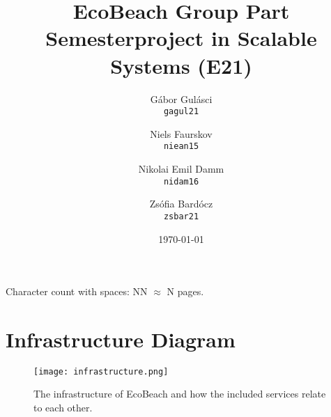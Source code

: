 \documentclass[12pt, oneside, notitlepage]{book}
\title{EcoBeach Group Part \\
    \large Semesterproject in Scalable Systems (E21)}
\author{
    Gábor Gulásci\\
    \texttt{gagul21}
    \and
    Niels Faurskov\\
    \texttt{niean15}
    \and
    Nikolai Emil Damm\\
    \texttt{nidam16}
    \and
    Zsófia Bardócz\\
    \texttt{zsbar21}    
}
\date{\today}
\begin{document}
\begin{titlingpage}
    \maketitle
    \begin{center}
        Character count with spaces: NN $\approx$ N pages.
    \end{center}
\end{titlingpage}
\frontmatter
% 

\tableofcontents

\mainmatter




\printnoidxglossary[type=acronym]
\printbibliography[heading=bibintoc]

\appendix
% 
\chapter{Infrastructure Diagram}\label{ch:infrastructure-diagram}

\begin{figure}[h!]
    \centering
    \texttt{[image: infrastructure.png]}
    \caption{The infrastructure of EcoBeach and how the included services relate to each other.}
\end{figure}
\restoregeometry
\end{document}
